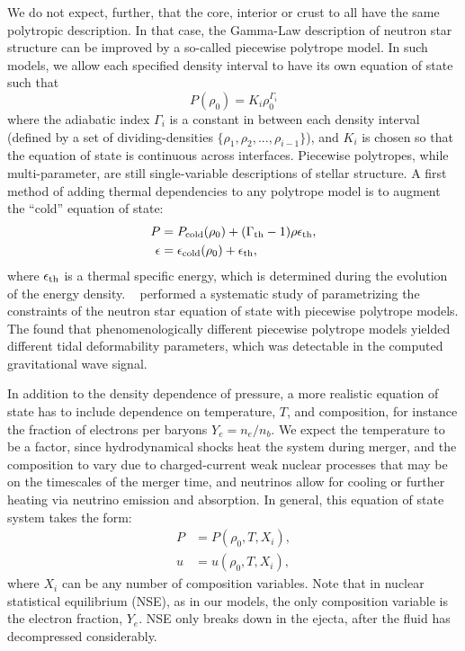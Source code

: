 We do not expect, further, that the core, interior or crust to all have the same polytropic description.
In that case, the Gamma-Law description of neutron star structure can be improved by a so-called piecewise polytrope model.
In such models, we allow each specified density interval to have its own equation of state such that 
$$P(\rho_0) = K_i \rho_0^{\Gamma_i}$$
where the adiabatic index $\Gamma_i$ is a constant in between each density interval (defined by a set of dividing-densities $\{\rho_1,\rho_2,...,\rho_{i-1} \}$), and $K_i$ is chosen so that the equation of state is continuous across interfaces.
Piecewise polytropes, while multi-parameter, are still single-variable descriptions of stellar structure.  
A first method of adding thermal dependencies to any polytrope model is to augment the ``cold'' equation of state:
\begin{align}
P &=  P_{\rm cold}(\rho_0) + (\Gamma_{\rm th}-1)\rho\epsilon_{\rm th} ,\\
\epsilon &=  \epsilon_{\rm cold}(\rho_0) + \epsilon_{\rm th}, 
\end{align}
where $\epsilon_{\rm th}$ is a thermal specific energy, which is determined during the evolution of the energy density.
~\cite{read2009constraints} performed a systematic study of parametrizing the constraints of the neutron star equation of state with piecewise polytrope models.
The found that phenomenologically different piecewise polytrope models yielded different tidal deformability parameters, which was detectable in the computed gravitational wave signal.


In addition to the density dependence of pressure, a more realistic equation of state has to include dependence on temperature, $T$, and composition, for instance the fraction of electrons per baryons $Y_e = n_e / n_b$.  
We expect the temperature to be a factor, since hydrodynamical shocks heat the system during merger, and the composition to vary due to charged-current weak nuclear processes that may be on the timescales of the merger time, and neutrinos allow for cooling or further heating via neutrino emission and absorption. 
In general, this equation of state system takes the form:
\begin{align}
P &= P(\rho_0, T, X_i), \\
u &= u(\rho_0, T, X_i),
\end{align}
where $X_i$ can be any number of composition variables.  
Note that in nuclear statistical equilibrium (NSE), as in our models, the only composition variable is the electron fraction, $Y_e$.  
NSE only breaks down in the ejecta, after the fluid has decompressed considerably.


